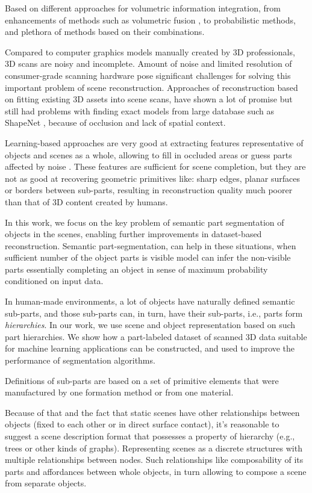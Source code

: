Based on different approaches for volumetric information integration, from enhancements of  methods such as volumetric fusion \cite{curless1996volumetric}, to probabilistic  methods, and plethora of methods based on their combinations.

Compared to computer graphics models manually created by 3D professionals, 3D scans are noisy and incomplete.
Amount of noise and limited resolution of consumer-grade scanning hardware pose significant challenges for solving this important problem of scene reconstruction. 
Approaches of reconstruction based on fitting existing 3D assets into scene scans, have shown a lot of promise but still had problems with finding exact models from large database such as ShapeNet \cite{chang2015shapenet}, because of occlusion and lack of spatial context.

Learning-based approaches are very good at extracting features representative of objects and scenes as a whole, allowing to fill in occluded areas or guess parts affected by noise \cite{dai2017shape,dai2018scancomplete,song2017semantic}. These features are sufficient for scene completion, but they are not as good at recovering geometric primitives like: sharp edges, planar surfaces or borders between sub-parts, resulting in reconstruction quality much poorer than that of 3D content created by humans.

In this work, we focus on the key problem of semantic part segmentation of objects in the scenes, enabling further improvements in  dataset-based reconstruction. 
Semantic part-segmentation, can help in these situations, when sufficient number of the object parts is visible model can infer the non-visible parts essentially completing an object in sense of maximum probability conditioned on input data.

In human-made environments, a lot of objects have naturally defined semantic sub-parts, and those sub-parts can, in turn, have their sub-parts, i.e., parts form \emph{hierarchies}.  In our work, we use scene and object representation based on such part hierarchies.  We show how a part-labeled dataset of scanned 3D data suitable for machine learning applications can be constructed, and used to improve the performance of segmentation algorithms. 

Definitions of sub-parts are based on a set of primitive elements that were manufactured by one formation method or from one material.

Because of that and the fact that static scenes have other relationships between objects (fixed to each other or in direct surface contact), it's reasonable to suggest a scene description format that possesses a property of hierarchy (e.g., trees or other kinds of graphs).
Representing scenes as a discrete structures with multiple relationships between nodes. Such relationships like composability of its parts and affordances between whole objects, in turn allowing to compose a scene from separate objects.

